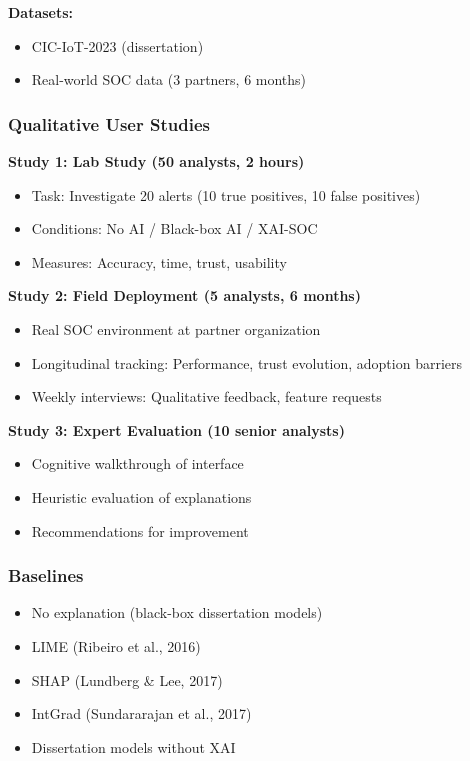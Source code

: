 \documentclass[11pt,letterpaper]{article}
\begin{document}
\textbf{Datasets:}
\begin{itemize}
\item CIC-IoT-2023 (dissertation)
\item Real-world SOC data (3 partners, 6 months)
\end{itemize}

\subsubsection{Qualitative User Studies}

\textbf{Study 1: Lab Study (50 analysts, 2 hours)}
\begin{itemize}
\item Task: Investigate 20 alerts (10 true positives, 10 false positives)
\item Conditions: No AI / Black-box AI / XAI-SOC
\item Measures: Accuracy, time, trust, usability
\end{itemize}

\textbf{Study 2: Field Deployment (5 analysts, 6 months)}
\begin{itemize}
\item Real SOC environment at partner organization
\item Longitudinal tracking: Performance, trust evolution, adoption barriers
\item Weekly interviews: Qualitative feedback, feature requests
\end{itemize}

\textbf{Study 3: Expert Evaluation (10 senior analysts)}
\begin{itemize}
\item Cognitive walkthrough of interface
\item Heuristic evaluation of explanations
\item Recommendations for improvement
\end{itemize}

\subsubsection{Baselines}

\begin{itemize}
\item No explanation (black-box dissertation models)
\item LIME (Ribeiro et al., 2016)
\item SHAP (Lundberg \& Lee, 2017)
\item IntGrad (Sundararajan et al., 2017)
\item Dissertation models without XAI
\end{itemize}
\end{document}
